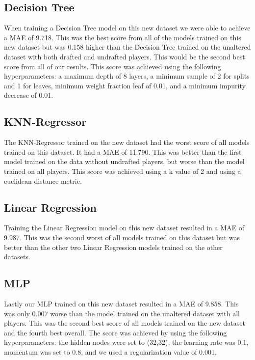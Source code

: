 \documentclass{article}
\begin{document}
\subsection{Decision Tree}

When training a Decision Tree model on this new dataset we were able to achieve
a MAE of 9.718. This was the best score from all of the models trained on this
new dataset but was 0.158 higher than the Decision Tree trained on the unaltered
dataset with both drafted and undrafted players. This would be the second best
score from all of our results. This score was achieved using the following
hyperparameters: a maximum depth of 8 layers, a minimum sample of 2 for splits
and 1 for leaves, minimum weight fraction leaf of 0.01, and a minimum impurity
decrease of 0.01.

\subsection{KNN-Regressor}

The KNN-Regressor trained on the new dataset had the worst score of all models
trained on this dataset. It had a MAE of 11.790. This was better than the first
model trained on the data without undrafted players, but worse than the model
trained on all players. This score was achieved using a k value of 2 and using a
euclidean distance metric.

\subsection{Linear Regression}

Training the Linear Regression model on this new dataset resulted in a MAE of
9.987. This was the second worst of all models trained on this dataset but was
better than the other two Linear Regression models trained on the other
datasets.

\subsection{MLP}

Lastly our MLP trained on this new dataset resulted in a MAE of 9.858. This was
only 0.007 worse than the model trained on the unaltered dataset with all
players. This was the second best score of all models trained on the new dataset
and the fourth best overall. The score was achieved by using the following
hyperparameters: the hidden nodes were set to (32,32), the learning rate was
0.1, momentum was set to 0.8, and we used a regularization value of 0.001.
\end{document}
